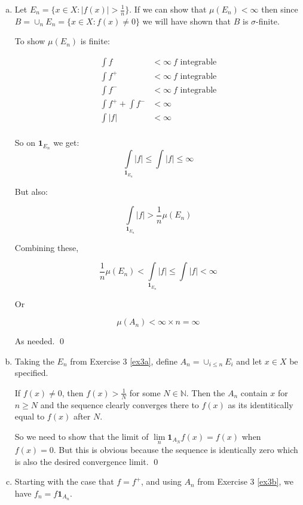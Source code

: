 \documentclass[11pt,oneside]{article}
\numberwithin{equation}{section}
\theoremstyle{definition}
\def\NN{\mathbb{N}}
\def\limn{\lim \limits _n}
\def\one{\mathbf{1}}
\begin{document}
\begin{solution}
\begin{enumerate}[(a)]
\item
  \label{ex3a}
  Let $E_n = \{ x \in X : | f(x) |  > \frac{1}{n} \}$.  If we can show that $\mu(E_n) < \infty$ then
  since $B = \cup _ n E_n = \{ x \in X : f(x) \neq 0 \}$ we will have shown that $B$ is $\sigma$-finite.

  To show $\mu(E_n)$ is finite:

  \begin{align*}
    \int f & < \infty \ f \textrm{ integrable} \\
    \int f^+ & < \infty \ f \textrm{ integrable} \\
    \int f^- & < \infty \ f \textrm{ integrable} \\
    \int f^+ + \int f^- & < \infty \\
    \int |f|  & < \infty \\
  \end{align*}

  So on $\one_{E_n}$ we get:
  \[
  \int \limits _{\one_{E_n}} |f | \leq   \int |f | \leq \infty
  \]

  But also:

  \[
  \int \limits _ {\one_{E_n}} |f|  > \frac{1}{n} \mu(E_n) 
  \]

  Combining these,

  \[
  \frac{1}{n} \mu(E_n) < \int \limits _{\one_{E_n}} |f| \leq \int |f| < \infty
  \]

  Or
  
  \[
  \mu(A_n) < \infty \times n = \infty
  \]

  As needed.  \qed

\item
  \label{ex3b}
  Taking the $E_n$ from Exercise 3 \ref{ex3a}, define $A_n = \cup _ {i \leq n} E_i$ and  let $x \in X$ be specified.

  If $f(x) \neq 0$, then $f(x) > \frac{1}{N}$ for some $N \in \NN$.  Then the $A_n$ contain $x$ for $ n \geq N$
  and the sequence clearly converges there to $f(x)$ as its identitically equal to $f(x)$ after $N$.

  So we need to show that the limit
  of $\limn \one _ { A_N} f(x) = f(x)$ when $f(x) = 0$.  But this is obvious because the sequence is identically
  zero which is also the desired convergence limit. \qed

  \item

    Starting with the case that $f = f^+$, and using $A_n$ from Exercise 3 \ref{ex3b}, we have $f_n = f \one_{A_n}$.


\end{enumerate}
\end{solution}
\end{document}
